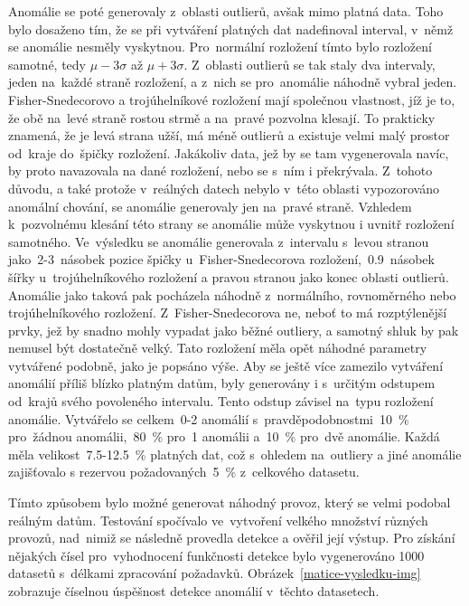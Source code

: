 Anomálie se poté generovaly z~oblasti outlierů, avšak mimo platná data. Toho bylo dosaženo tím, že se při vytváření platných dat nadefinoval interval, v~němž se anomálie nesměly vyskytnou. Pro~normální rozložení tímto bylo rozložení samotné, tedy \(\mu - 3\sigma\) až \(\mu + 3\sigma\). Z~oblasti outlierů se tak staly dva intervaly, jeden na~každé straně rozložení, a z~nich se pro~anomálie náhodně vybral jeden. Fisher-Snedecorovo a trojúhelníkové rozložení mají společnou vlastnost, jíž je to, že obě na~levé straně rostou strmě a na~pravé pozvolna klesají. To prakticky znamená, že je levá strana užší, má méně outlierů a existuje velmi malý prostor od~kraje do~špičky rozložení. Jakákoliv data, jež by se tam vygenerovala navíc, by proto navazovala na dané rozložení, nebo se s~ním i překrývala. Z~tohoto důvodu, a také protože v~reálných datech nebylo v~této oblasti vypozorováno anomální chování, se anomálie generovaly jen na~pravé straně. Vzhledem k~pozvolnému klesání této strany se anomálie může vyskytnou i uvnitř rozložení samotného. Ve~výsledku se anomálie generovala z~intervalu s~levou stranou jako~2-3~násobek pozice špičky u~Fisher-Snedecorova rozložení,~0.9~násobek šířky u~trojúhelníkového rozložení a pravou stranou jako konec oblasti outlierů. Anomálie jako taková pak pocházela náhodně z~normálního, rovnoměrného nebo trojúhelníkového rozložení. Z~Fisher-Snedecorova ne, neboť to má rozptýlenější prvky, jež by snadno mohly vypadat jako běžné outliery, a samotný shluk by pak nemusel být dostatečně velký. Tato rozložení měla opět náhodné parametry vytvářené podobně, jako je popsáno výše. Aby se ještě více zamezilo vytváření anomálií příliš blízko platným datům, byly generovány i s~určitým odstupem od~krajů svého povoleného intervalu. Tento odstup závisel na~typu rozložení anomálie. Vytvářelo se celkem~0-2 anomálií s~pravděpodobnostmi~10~\% pro~žádnou anomálii,~80~\% pro~1 anomálii a~10~\% pro~dvě anomálie. Každá měla velikost~7.5-12.5~\% platných dat, což s~ohledem na~outliery a jiné anomálie zajišťovalo s rezervou požadovaných~5~\% z~celkového datasetu.

Tímto způsobem bylo možné generovat náhodný provoz, který se velmi podobal reálným datům. Testování spočívalo ve~vytvoření velkého množství různých provozů, nad~nimiž se následně provedla detekce a ověřil její výstup. Pro získání nějakých čísel pro~vyhodnocení funkčnosti detekce bylo vygenerováno 1000 datasetů s~délkami zpracování požadavků. Obrázek~\ref{matice-vysledku-img} zobrazuje číselnou úspěšnost detekce anomálií v~těchto datasetech.

